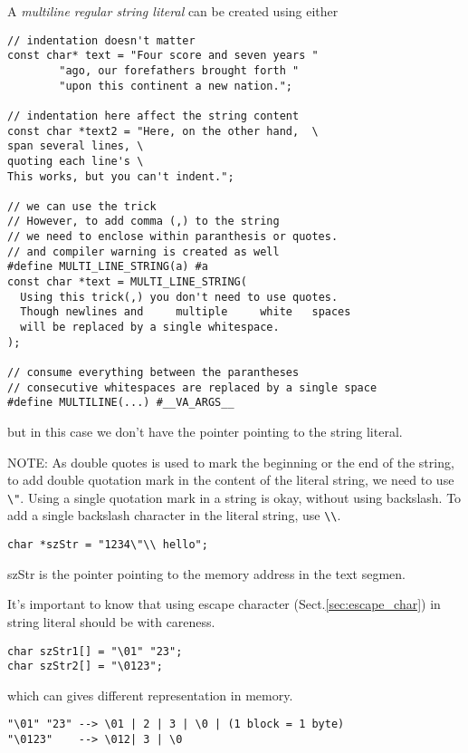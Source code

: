 A {\it multiline regular string literal} can be created using either
\begin{verbatim}
// indentation doesn't matter
const char* text = "Four score and seven years "
        "ago, our forefathers brought forth "
        "upon this continent a new nation.";
        
// indentation here affect the string content
const char *text2 = "Here, on the other hand,  \
span several lines, \
quoting each line's \
This works,	but you can't indent.";

// we can use the trick
// However, to add comma (,) to the string
// we need to enclose within paranthesis or quotes.
// and compiler warning is created as well
#define MULTI_LINE_STRING(a) #a
const char *text = MULTI_LINE_STRING(
  Using this trick(,) you don't need to use quotes.
  Though newlines and     multiple     white   spaces
  will be replaced by a single whitespace.
);

// consume everything between the parantheses
// consecutive whitespaces are replaced by a single space
#define MULTILINE(...) #__VA_ARGS__
\end{verbatim}
but in this case we don't have the pointer pointing to the string literal.


NOTE: As double quotes is used to mark the beginning or the end of the string,
to add double quotation mark in the content of the literal string, we need to
use \verb!\"!. Using a single quotation mark in a string is okay, without using
backslash. To add a single backslash character in the literal string, use
\verb!\\!.
\begin{verbatim}
char *szStr = "1234\"\\ hello";
\end{verbatim}
szStr is the pointer pointing to the memory address in the text segmen.



\begin{mdframed}
It's important to know that using escape character (Sect.\ref{sec:escape_char})
in string literal should be with careness.
\begin{verbatim}
char szStr1[] = "\01" "23";
char szStr2[] = "\0123";
\end{verbatim}
which can gives different representation in memory.
\begin{verbatim}
"\01" "23" --> \01 | 2 | 3 | \0 | (1 block = 1 byte)
"\0123"    --> \012| 3 | \0
\end{verbatim}
\end{mdframed}

